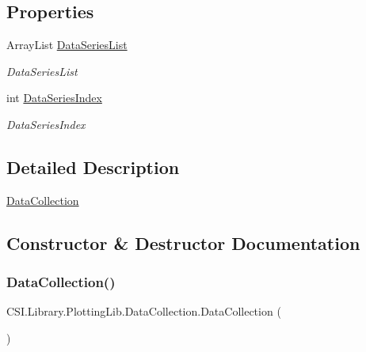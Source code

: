 \subsection*{Properties}
\begin{DoxyCompactItemize}
\item 
Array\+List \mbox{\hyperlink{class_c_s_i_1_1_library_1_1_plotting_lib_1_1_data_collection_a142bef1ecac01965be2f829f84e5d7d1}{Data\+Series\+List}}
\begin{DoxyCompactList}\small\item\em Data\+Series\+List \end{DoxyCompactList}\item 
int \mbox{\hyperlink{class_c_s_i_1_1_library_1_1_plotting_lib_1_1_data_collection_ab77a80da2b97468587dc370094579482}{Data\+Series\+Index}}
\begin{DoxyCompactList}\small\item\em Data\+Series\+Index \end{DoxyCompactList}\end{DoxyCompactItemize}


\subsection{Detailed Description}
\mbox{\hyperlink{class_c_s_i_1_1_library_1_1_plotting_lib_1_1_data_collection}{Data\+Collection}} 



\subsection{Constructor \& Destructor Documentation}
\mbox{\label{class_c_s_i_1_1_library_1_1_plotting_lib_1_1_data_collection_a335a7c887f3a3f97e3cc2ef8fd6b4e10}} 
\subsubsection{\texorpdfstring{DataCollection()}{DataCollection()}}
{\footnotesize\ttfamily C\+S\+I.\+Library.\+Plotting\+Lib.\+Data\+Collection.\+Data\+Collection (\begin{DoxyParamCaption}{ }\end{DoxyParamCaption})\hspace{0.3cm}{\ttfamily [inline]}}



